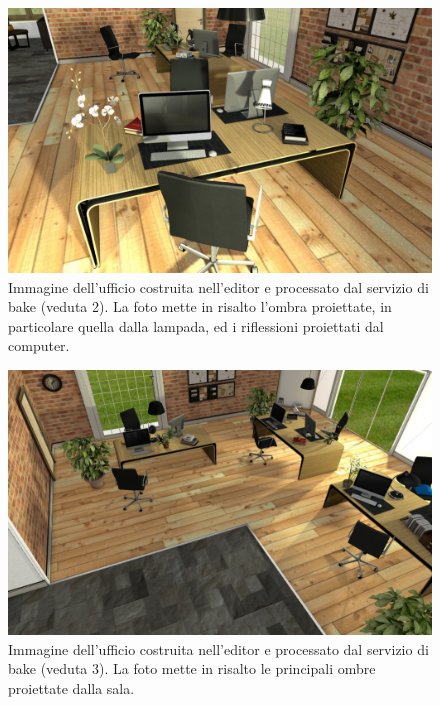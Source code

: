 \begin{figure}[htb]
 \centering
 \includegraphics[width=0.9\linewidth]{images/chapter_prove_sperimentali/scena_office_vista2.png}\hfill
 \caption[Ambiente virtuale: Ufficio, veduta 2]{Immagine dell'ufficio costruita nell'editor e processato dal servizio di bake (veduta 2). La foto mette in risalto l'ombra proiettate, in particolare quella dalla lampada, ed i riflessioni proiettati dal computer.}
 \label{fig:prove_sperimentali_qualita_visiva_ufficio_2}
\end{figure}
\begin{figure}[htb]
 \centering
 \includegraphics[width=0.9\linewidth]{images/chapter_prove_sperimentali/scena_office_vista4.png}\hfill
 \caption[Ambiente virtuale: Ufficio, veduta 3]{Immagine dell'ufficio costruita nell'editor e processato dal servizio di bake (veduta 3). La foto mette in risalto le principali ombre proiettate dalla sala.}
 \label{fig:prove_sperimentali_qualita_visiva_ufficio_3}
\end{figure}
